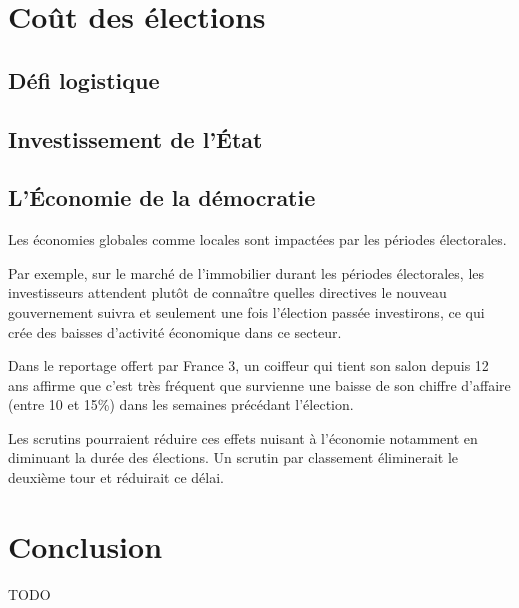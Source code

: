 \documentclass[12pt,a4paper]{report}
\begin{document}
\section{Coût des élections}

\subsection{Défi logistique}
\subsection{Investissement de l'État}
\subsection{L'Économie de la démocratie}

Les économies globales comme locales sont impactées par les périodes électorales.

Par exemple, sur le marché de l’immobilier durant les périodes électorales, les investisseurs attendent plutôt de connaître quelles directives le nouveau gouvernement suivra et seulement une fois l'élection passée investirons, ce qui crée des baisses d’activité économique dans ce secteur.

Dans le reportage offert par France 3\nocite{fr3:impact}, un coiffeur qui tient son salon depuis 12 ans affirme que c’est très fréquent que survienne une baisse de son chiffre d’affaire (entre 10 et 15\%) dans les semaines précédant l'élection.

Les scrutins pourraient réduire ces effets nuisant à l'économie notamment en diminuant la durée des élections. Un scrutin par classement éliminerait le deuxième tour et réduirait ce délai.



\newpage
\section*{Conclusion}
TODO

 

\end{document}
